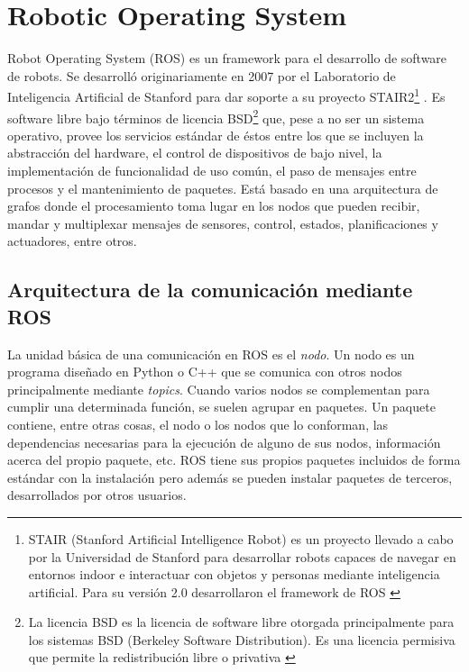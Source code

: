 \section{Robotic Operating System}

Robot Operating System (ROS) es un framework para el desarrollo de software de robots. Se desarrolló originariamente en 2007 por el Laboratorio de Inteligencia Artificial de Stanford para dar soporte a su proyecto STAIR2\footnote{STAIR (Stanford Artificial Intelligence Robot) es un proyecto llevado a cabo por la Universidad de Stanford para desarrollar robots capaces de navegar en entornos indoor e interactuar con objetos y personas mediante inteligencia artificial. Para su versión 2.0 desarrollaron el framework de ROS \cite{stair}} \cite{stair_paper}. Es software libre bajo términos de licencia BSD\footnote{La licencia BSD es la licencia de software libre otorgada principalmente para los sistemas BSD (Berkeley Software Distribution). Es una licencia permisiva que permite la redistribución libre o privativa \cite{licencia}} que, pese a no ser un sistema operativo, provee los servicios estándar de éstos entre los que se incluyen la abstracción del hardware, el control de dispositivos de bajo nivel, la implementación de funcionalidad de uso común, el paso de mensajes entre procesos y el mantenimiento de paquetes. Está basado en una arquitectura de grafos donde el procesamiento toma lugar en los nodos que pueden recibir, mandar y multiplexar mensajes de sensores, control, estados, planificaciones y actuadores, entre otros.\\


\subsection{Arquitectura de la comunicación mediante ROS}

La unidad básica de una comunicación en ROS es el \textit{nodo}. Un nodo es un programa diseñado en Python o C++ que se comunica con otros nodos principalmente mediante \textit{topics}. Cuando varios nodos se complementan para cumplir una determinada función, se suelen agrupar en paquetes. Un paquete contiene, entre otras cosas, el nodo o los nodos que lo conforman, las dependencias necesarias para la ejecución de alguno de sus nodos, información acerca del propio paquete, etc. ROS tiene sus propios paquetes incluidos de forma estándar con la instalación pero además se pueden instalar paquetes de terceros, desarrollados por otros usuarios.\\

